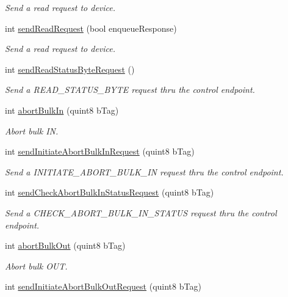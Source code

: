 \begin{DoxyCompactItemize}
\begin{DoxyCompactList}\small\item\em Send a read request to device. \end{DoxyCompactList}\item 
int \hyperlink{classmdt_usbtmc_port_manager_ab1604a1c8f2e9192714d039dbf9a5158}{sendReadRequest} (bool enqueueResponse)
\begin{DoxyCompactList}\small\item\em Send a read request to device. \end{DoxyCompactList}\item 
int \hyperlink{classmdt_usbtmc_port_manager_a7bcc280bd4a26ed523832550b1e61553}{sendReadStatusByteRequest} ()
\begin{DoxyCompactList}\small\item\em Send a READ\_\-STATUS\_\-BYTE request thru the control endpoint. \end{DoxyCompactList}\item 
int \hyperlink{classmdt_usbtmc_port_manager_ae845b25c292e83ef9fe01640867c7116}{abortBulkIn} (quint8 bTag)
\begin{DoxyCompactList}\small\item\em Abort bulk IN. \end{DoxyCompactList}\item 
int \hyperlink{classmdt_usbtmc_port_manager_ad52e35820d576a9dba9dc33feacb0202}{sendInitiateAbortBulkInRequest} (quint8 bTag)
\begin{DoxyCompactList}\small\item\em Send a INITIATE\_\-ABORT\_\-BULK\_\-IN request thru the control endpoint. \end{DoxyCompactList}\item 
int \hyperlink{classmdt_usbtmc_port_manager_a24350448e3b021360f6afb5f1bfba877}{sendCheckAbortBulkInStatusRequest} (quint8 bTag)
\begin{DoxyCompactList}\small\item\em Send a CHECK\_\-ABORT\_\-BULK\_\-IN\_\-STATUS request thru the control endpoint. \end{DoxyCompactList}\item 
int \hyperlink{classmdt_usbtmc_port_manager_af412ba1b1e7e56ebecd2e59cb6bf607a}{abortBulkOut} (quint8 bTag)
\begin{DoxyCompactList}\small\item\em Abort bulk OUT. \end{DoxyCompactList}\item 
int \hyperlink{classmdt_usbtmc_port_manager_a987b71d620dac06be85567a92f272f6b}{sendInitiateAbortBulkOutRequest} (quint8 bTag)

\end{DoxyCompactItemize}
